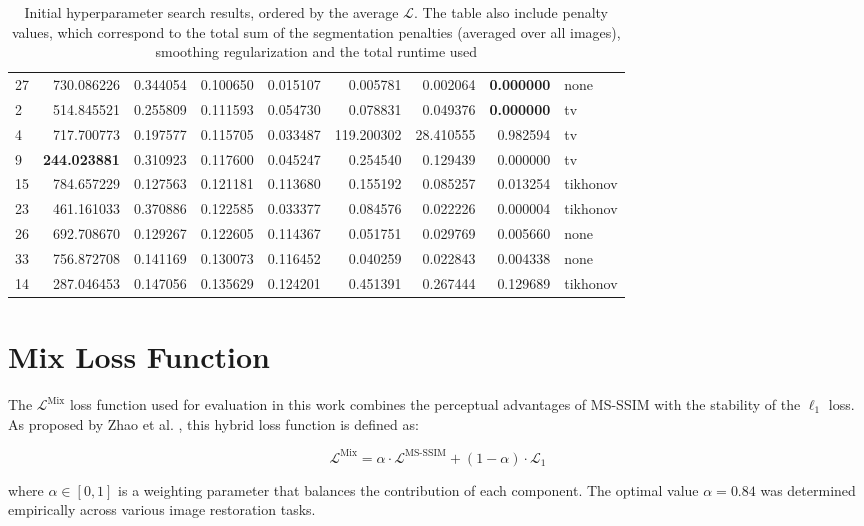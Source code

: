 \documentclass[nomenclature, english, bibtex]{kththesis}
\numberwithin{listing}{chapter}
\begin{document}
\begin{table}
\begin{tabularx}{\linewidth}{lrrrrrrrl}
 27 & 730.086226 & 0.344054 & 0.100650 & 0.015107 & 0.005781 & 0.002064 & \bfseries 0.000000 & none \\
 2 & 514.845521 & 0.255809 & 0.111593 & 0.054730 & 0.078831 & 0.049376 & \bfseries 0.000000 & tv \\
 4 & 717.700773 & 0.197577 & 0.115705 & 0.033487 & 119.200302 & 28.410555 & 0.982594 & tv \\
 9 & \bfseries 244.023881 & 0.310923 & 0.117600 & 0.045247 & 0.254540 & 0.129439 & 0.000000 & tv \\
 15 & 784.657229 & 0.127563 & 0.121181 & 0.113680 & 0.155192 & 0.085257 & 0.013254 & tikhonov \\
 23 & 461.161033 & 0.370886 & 0.122585 & 0.033377 & 0.084576 & 0.022226 & 0.000004 & tikhonov \\
 26 & 692.708670 & 0.129267 & 0.122605 & 0.114367 & 0.051751 & 0.029769 & 0.005660 & none \\
 33 & 756.872708 & 0.141169 & 0.130073 & 0.116452 & 0.040259 & 0.022843 & 0.004338 & none \\
 14 & 287.046453 & 0.147056 & 0.135629 & 0.124201 & 0.451391 & 0.267444 & 0.129689 & tikhonov
 \end{tabularx}
\caption{Initial hyperparameter search results, ordered by the average $\mathcal{L}$.
The table also include penalty values, which correspond to the total sum of the
segmentation penalties (averaged over all images), smoothing regularization and the
total runtime used}
\label{tab:hyperparameterSearch}
\end{table}

\chapter{Mix Loss Function}
\label{app:mixLoss}

The $\mathcal{L}^{\text{Mix}}$ loss function used for evaluation in this work combines the perceptual advantages of \acrfull{MS-SSIM} with the stability of the $\ell_1$ loss. As proposed by Zhao et al. \cite{zhaoLossFunctionsImage2017}, this hybrid loss function is defined as:

\begin{equation}
\mathcal{L}^{\text{Mix}} = \alpha \cdot \mathcal{L}^{\text{MS-SSIM}} + (1 - \alpha) \cdot \mathcal{L}_1
\label{eq:mixLoss}
\end{equation}

where $\alpha \in [0, 1]$ is a weighting parameter that balances the contribution of each component. The optimal value $\alpha = 0.84$ was determined empirically across various image restoration tasks.
\end{document}

